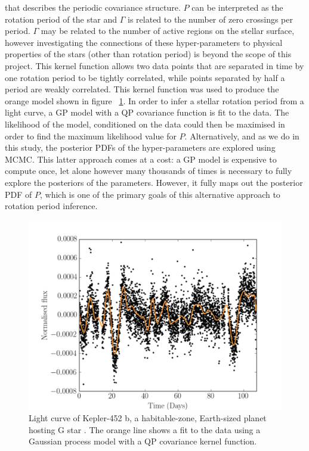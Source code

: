 that describes the periodic covariance structure.
$P$ can be interpreted as the rotation period of the star and $\Gamma$ is
related to the number of zero crossings per period.
$\Gamma$ may be related to the number of active regions on the stellar
surface, however investigating the connections of these hyper-parameters to
physical properties of the stars (other than rotation period) is beyond the
scope of this project.
This kernel function allows two data points that are separated in time by one
rotation period to be tightly correlated, while points separated by half a
period are weakly correlated.
This kernel function was used to produce the orange model shown in figure
~\ref{fig:GP_example}.
In order to infer a stellar rotation period from a light curve, a GP model
with a QP covariance function is fit to the data.
The likelihood of the model, conditioned on the data could then be maximised
in order to find the maximum likelihood value for $P$.
Alternatively, and as we do in this study, the posterior PDFs of the
hyper-parameters are explored using MCMC.
This latter approach comes at a cost: a GP model is expensive to compute
once, let alone however many thousands of times is necessary to fully explore
the posteriors of the parameters.
However, it fully maps out the posterior PDF of $P$, which is one of the
primary goals of this alternative approach to rotation period inference.

\begin{figure}
\begin{center}
\includegraphics[width=6in, clip=true]{figures/Kepler452b.pdf}
\caption{Light curve of Kepler-452 b, a habitable-zone, Earth-sized planet
hosting G star \citep{jenkins}. The orange line shows a fit to the data using
a Gaussian process model with a QP covariance kernel function.}
\label{fig:GP_example}
\end{center}
\end{figure}

